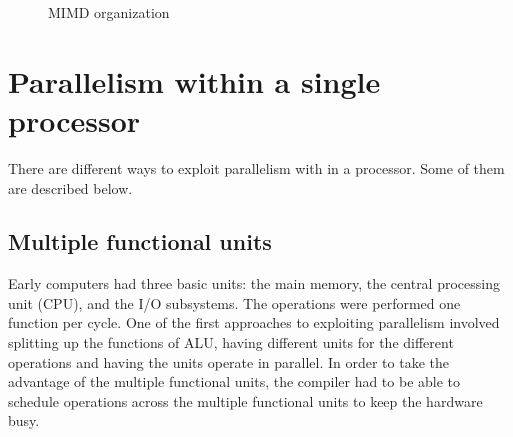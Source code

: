 \begin{figure}[ht]
{\centering {} \par}
\caption{MIMD organization}
\end{figure}

\section{Parallelism within a single processor}
There are different ways to exploit parallelism with in a processor. Some of them are described below.
\subsection{Multiple functional units}
Early computers had three basic units: the main memory, the central processing unit (CPU), and the I/O subsystems. The operations were performed one function
per cycle. One of the first approaches to exploiting parallelism involved splitting up the functions of ALU, having different units for the different
operations and having the units operate in parallel. In order to take the advantage of the multiple functional units, the compiler had to be able to schedule
operations across the multiple functional units to keep the hardware busy.

